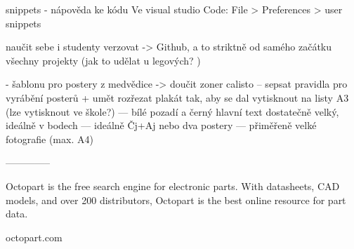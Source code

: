 snippets - nápověda ke kódu 
Ve visual studio Code:  
File > Preferences > user snippets 




naučit sebe i studenty verzovat -> Github, a to striktně od samého začátku všechny projekty (jak to udělat u legových? )

- šablonu pro postery z medvědice -> doučit zoner calisto 
-- sepsat pravidla pro vyrábění posterů + umět rozřezat plakát tak, aby se dal vytisknout na listy A3 (lze vytisknout ve škole?)
--- bílé pozadí a černý hlavní text dostatečně velký, ideálně v bodech 
--- ideálně Čj+Aj nebo dva postery  
--- přiměřeně velké fotografie (max. A4)


--------------

Octopart is the free search engine for electronic parts.
With datasheets, CAD models, and over 200 distributors,
Octopart is the best online resource for part data.

octopart.com


